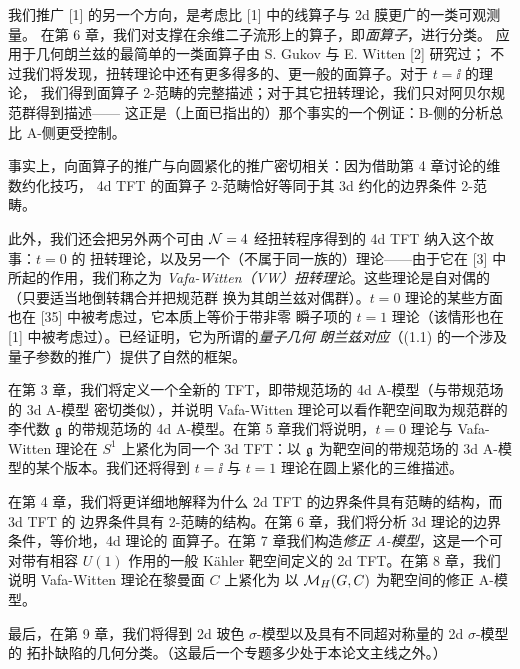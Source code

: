 

我们推广 [1] 的另一个方向，是考虑比 [1] 中的线算子与 2d 膜更广的一类可观测量。
在第 6 章，我们对支撑在余维二子流形上的算子，即\emph{面算子}，进行分类。
应用于几何朗兰兹的最简单的一类面算子由 S. Gukov 与 E. Witten [2] 研究过；
不过我们将发现，扭转理论中还有更多得多的、更一般的面算子。对于 $t=\ii$ 的理论，
我们得到面算子 2-范畴的完整描述；对于其它扭转理论，我们只对阿贝尔规范群得到描述——
这正是（上面已指出的）那个事实的一个例证：B-侧的分析总比 A-侧更受控制。

事实上，向面算子的推广与向圆紧化的推广密切相关：因为借助第 4 章讨论的维数约化技巧，
4d TFT 的面算子 2-范畴恰好等同于其 3d 约化的边界条件 2-范畴。


此外，我们还会把另外两个可由 $\mathcal{N}=4$ 经扭转程序得到的 4d TFT 纳入这个故事：$t=0$ 的
扭转理论，以及另一个（不属于同一族的）理论——由于它在 [3] 中所起的作用，我们称之为
\emph{Vafa-Witten（VW）扭转理论}。这些理论是自对偶的（只要适当地倒转耦合并把规范群
换为其朗兰兹对偶群）。$t=0$ 理论的某些方面也在 [35] 中被考虑过，它本质上等价于带非零
瞬子项的 $t=1$ 理论（该情形也在 [1] 中被考虑过）。已经证明，它为所谓的\emph{量子几何
朗兰兹对应}（(1.1) 的一个涉及量子参数的推广）提供了自然的框架。

在第 3 章，我们将定义一个全新的 TFT，即带规范场的 4d A-模型（与带规范场的 3d A-模型
密切类似），并说明 Vafa-Witten 理论可以看作靶空间取为规范群的李代数 $\mathfrak{g}$ 的带规范场的
4d A-模型。在第 5 章我们将说明，$t=0$ 理论与 Vafa-Witten 理论在 $S^1$ 上紧化为同一个
3d TFT：以 $\mathfrak{g}$ 为靶空间的带规范场的 3d A-模型的某个版本。我们还将得到 $t=\ii$ 与
$t=1$ 理论在圆上紧化的三维描述。

在第 4 章，我们将更详细地解释为什么 2d TFT 的边界条件具有范畴的结构，而 3d TFT 的
边界条件具有 2-范畴的结构。在第 6 章，我们将分析 3d 理论的边界条件，等价地，4d 理论的
面算子。在第 7 章我们构造\emph{修正 A-模型}，这是一个可对带有相容 $U(1)$ 作用的一般
Kähler 靶空间定义的 2d TFT。在第 8 章，我们说明 Vafa-Witten 理论在黎曼面 $C$ 上紧化为
以 $\mathcal{M}_H(G,C)$ 为靶空间的修正 A-模型。

最后，在第 9 章，我们将得到 2d 玻色 $\sigma$-模型以及具有不同超对称量的 2d $\sigma$-模型的
拓扑缺陷的几何分类。（这最后一个专题多少处于本论文主线之外。）
